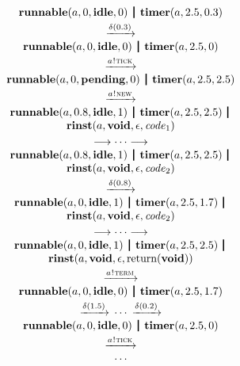 \documentclass[twocolumn]{article}
\begin{document}
$$
\begin{array}{c}
  {\Trunnable a 0 \Tidle 0} \Opar
  {\Ttimer a {2.5} {0.3}} \vspace{0.6ex} \\
  \red{\Tdelta {0.3}} \\
  {\Trunnable a 0 \Tidle 0} \Opar
  {\Ttimer a {2.5} 0} \vspace{0.6ex} \\
  \red{\say a \Ttick} \\
  {\Trunnable a 0 \Tpending 0} \Opar
  {\Ttimer a {2.5} {2.5}} \vspace{0.6ex} \\
  \red{\say a \Tnew} \\
  {\Trunnable a {0.8} \Tidle 1} \Opar
  {\Ttimer a {2.5} {2.5}} \,\Opar \\
  {\Trinst a \Tvoid \Teps {\Code_1}} \vspace{0.6ex} \\
  \longrightarrow \cdots \longrightarrow \\
  {\Trunnable a {0.8} \Tidle 1} \Opar
  {\Ttimer a {2.5} {2.5}} \,\Opar \\
  {\Trinst a \Tvoid \Teps {\Code_2}} \vspace{0.6ex} \\
  \red{\Tdelta {0.8}} \\
  {\Trunnable a 0 \Tidle 1} \Opar
  {\Ttimer a {2.5} {1.7}} \,\Opar \\
  {\Trinst a \Tvoid \Teps {\Code_2}} \vspace{0.6ex} \\
  \longrightarrow \cdots \longrightarrow \\
  {\Trunnable a 0 \Tidle 1} \Opar
  {\Ttimer a {2.5} {2.5}} \,\Opar \\
  {\Trinst a \Tvoid \Teps {\Treturn \Tvoid}} \vspace{0.6ex} \\
  \red{\say a \Tterm} \\
  {\Trunnable a 0 \Tidle 0} \Opar
  {\Ttimer a {2.5} {1.7}} \vspace{0.6ex} \\
  \red{\Tdelta {1.5}} \cdots \red{\Tdelta {0.2}} \\
  {\Trunnable a 0 \Tidle 0} \Opar
  {\Ttimer a {2.5} 0} \vspace{0.6ex} \\
  \red{\say a \Ttick} \\
  \cdots
\end{array}
$$
\end{document}

